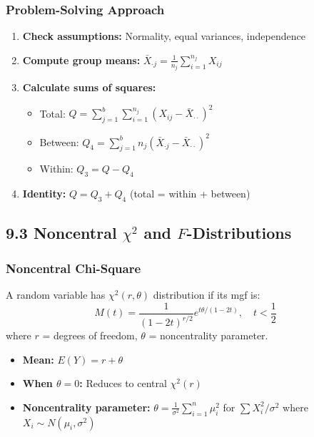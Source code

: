 \subsubsection{Problem-Solving Approach}

\begin{enumerate}
	\item \textbf{Check assumptions:} Normality, equal variances, independence
	\item \textbf{Compute group means:} $\bar{X}_{\cdot j} = \frac{1}{n_j}\sum_{i=1}^{n_j} X_{ij}$
	\item \textbf{Calculate sums of squares:}
	\begin{itemize}
		\item Total: $Q = \sum_{j=1}^b \sum_{i=1}^{n_j}(X_{ij} - \bar{X}_{\cdot \cdot})^2$
		\item Between: $Q_4 = \sum_{j=1}^b n_j(\bar{X}_{\cdot j} - \bar{X}_{\cdot \cdot})^2$
		\item Within: $Q_3 = Q - Q_4$
	\end{itemize}
	\item \textbf{Identity:} $Q = Q_3 + Q_4$ (total = within + between)
\end{enumerate}

\subsection{9.3 Noncentral \texorpdfstring{$\chi^2$}{chi^2} and \texorpdfstring{$F$}{F}-Distributions}

\subsubsection{Noncentral Chi-Square}

\begin{definition}
A random variable has $\chi^2(r, \theta)$ distribution if its mgf is:
\[
M(t) = \frac{1}{(1-2t)^{r/2}} e^{t\theta/(1-2t)}, \quad t < \frac{1}{2}
\]
where $r$ = degrees of freedom, $\theta$ = noncentrality parameter.
\end{definition}
\begin{itemize}
	\item \textbf{Mean:} $E(Y) = r + \theta$
	\item \textbf{When $\theta = 0$:} Reduces to central $\chi^2(r)$
	\item \textbf{Noncentrality parameter:} $\theta = \frac{1}{\sigma^2}\sum_{i=1}^n \mu_i^2$ for $\sum X_i^2/\sigma^2$ where $X_i \sim N(\mu_i, \sigma^2)$
\end{itemize}

